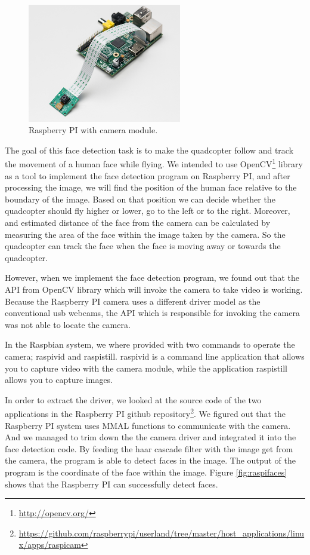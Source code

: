 \documentclass[11pt, a4paper, onecolumn, oneside, parskip=half]{scrartcl}
\begin{document}
\begin{figure}[ht]
\centering
\includegraphics[width=0.6\textwidth]{image03}
\caption{Raspberry PI with camera module.}
\label{fig:raspicamera}
\end{figure}

The goal of this face detection task is to make the quadcopter follow and track the movement of a human face while flying. We intended to use OpenCV\footnote{\url{http://opencv.org/}} library as a tool to implement the face detection program on Raspberry PI, and after processing the image, we will find the position of the human face relative to the boundary of the image. Based on that position we can decide whether the quadcopter should fly higher or lower, go to the left or to the right. Moreover, and estimated distance of the face from the camera can be calculated by measuring the area of the face within the image taken by the camera. So the quadcopter can track the face when the face is moving away or towards the quadcopter.

However, when we implement the face detection program, we found out that the API from OpenCV library which will invoke the camera to take video is working. Because the Raspberry PI camera uses a different driver model as the conventional usb webcams, the API which is responsible for invoking the camera was not able to locate the camera.

In the Raspbian system, we where provided with two commands to operate the camera; raspivid and raspistill. raspivid is a command line application that allows you to capture video with the camera module, while the application raspistill allows you to capture images.

In order to extract the driver, we looked at the source code of the two applications in the Raspberry PI github repository\footnote{\url{https://github.com/raspberrypi/userland/tree/master/host_applications/linux/apps/raspicam}}. We figured out that the Raspberry PI system uses MMAL functions to communicate with the camera. And we managed to trim down the the camera driver and integrated it into the face detection code. By feeding the haar cascade filter with the image get from the camera, the program is able to detect faces in the image. The output of the program is the coordinate of the face within the image. Figure \ref{fig:raspifaces} shows that the Raspberry PI can successfully detect faces.
\end{document}
